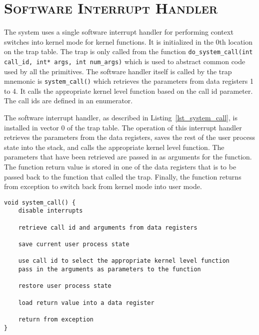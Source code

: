 \documentclass[oneside]{report}
\begin{document}
\pagebreak

\section{\textsc{Software Interrupt Handler}}
\label{sec:soft_isr}

The system uses a single software interrupt handler for performing context
switches into kernel mode for kernel functions. It is initialized in the 0th
location on the trap table. The trap is only called from the function
\texttt{do\_system\_call(int call\_id, int* args, int num\_args)} which is used
to abstract common code used by all the primitives. The software handler itself
is called by the trap mnemonic is \texttt{system\_call()} which retrieves
the parameters from data registers 1 to 4. It calls the appropriate kernel
level function based on the call id parameter. The call ids are defined in an
enumerator. 

The software interrupt handler, as described in Listing~\ref{lst_system_call},
is installed in vector 0 of the trap table. The operation of this interrupt
handler retrieves the parameters from the data registers, saves the rest of
the user process state into the stack, and calls the appropriate kernel level
function. The parameters that have been retrieved are passed in as arguments for 
the function. The function return value is stored in one of the data registers 
that is to be passed back to the function that called the trap. Finally, the 
function returns from exception to switch back from kernel mode into user mode.

\begin{lstlisting}
void system_call() {
    disable interrupts

    retrieve call id and arguments from data registers

    save current user process state

    use call id to select the appropriate kernel level function 
    pass in the arguments as parameters to the function

    restore user process state

    load return value into a data register

    return from exception
}
\end{lstlisting}

\pagebreak
\end{document}
